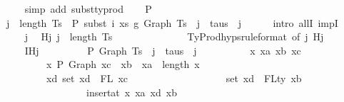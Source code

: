 \begin{isabellebody}
\ \ \ \ \ \ \isamarkupfalse%
\ {\isacharparenleft}{\kern0pt}simp\ add{\isacharcolon}{\kern0pt}\ subst{\isacharunderscore}{\kern0pt}typrod{\isacharparenright}{\kern0pt}\isanewline
\isanewline
\ \ \isamarkupfalse%
\ P{}{}{\isacharcolon}{\kern0pt}\isanewline
\ \ \ \ {\isachardoublequoteopen}{\isasymforall}j\ {\isacharless}{\kern0pt}\ length\ Ts{\isachardot}{\kern0pt}\ {\isasymGamma}{}\ {\isasymturnstile}{\isacharbraceleft}{\kern0pt}P{\isacharbraceright}{\kern0pt}\ subst\ i\ xs\ g{}\ {\isacharparenleft}{\kern0pt}Graph\ {\isacharparenleft}{\kern0pt}Ts\ {\isacharbang}{\kern0pt}\ j{\isacharparenright}{\kern0pt}{\isacharparenright}{\kern0pt}\ {\isacharcolon}{\kern0pt}\ taus\ {\isacharbang}{\kern0pt}\ j{\isachardoublequoteclose}\isanewline
\ \ \ \ \isamarkupfalse%
\ {\isacharparenleft}{\kern0pt}intro\ allI\ impI{\isacharparenright}{\kern0pt}\isanewline
\ \ \ \ \ \ \isamarkupfalse%
\ j\ \isamarkupfalse%
\ Hj{\isacharcolon}{\kern0pt}\ {\isachardoublequoteopen}j\ {\isacharless}{\kern0pt}\ length\ Ts{\isachardoublequoteclose}\isanewline
\isanewline
\ \ \ \ \ \ \isanewline
\ \ \ \ \ \ \isamarkupfalse%
\ TyProd{\isachardot}{\kern0pt}hyps{\isacharparenleft}{\kern0pt}{}{\isacharparenright}{\kern0pt}{\isacharbrackleft}{\kern0pt}rule{\isacharunderscore}{\kern0pt}format{\isacharcomma}{\kern0pt}\ of\ j{\isacharbrackright}{\kern0pt}\ Hj\isanewline
\ \ \ \ \ \ \isamarkupfalse%
\ IHj{\isacharcolon}{\kern0pt}\isanewline
\ \ \ \ \ \ \ \ {\isachardoublequoteopen}{\isasymGamma}\ {\isasymturnstile}{\isacharbraceleft}{\kern0pt}P{\isacharbraceright}{\kern0pt}\ Graph\ {\isacharparenleft}{\kern0pt}Ts\ {\isacharbang}{\kern0pt}\ j{\isacharparenright}{\kern0pt}\ {\isacharcolon}{\kern0pt}\ taus\ {\isacharbang}{\kern0pt}\ j\ {\isasymand}\isanewline
\ \ \ \ \ \ \ \ \ {\isacharparenleft}{\kern0pt}{\isasymforall}x\ xa\ xb\ xc{\isachardot}{\kern0pt}\isanewline
\ \ \ \ \ \ \ \ \ \ \ \ x\ {\isasymturnstile}{\isacharbraceleft}{\kern0pt}P{\isacharbraceright}{\kern0pt}\ Graph\ xc\ {\isacharcolon}{\kern0pt}\ xb\ {\isasymlongrightarrow}\ xa\ {\isasymle}\ length\ x\ {\isasymlongrightarrow}\isanewline
\ \ \ \ \ \ \ \ \ \ \ \ {\isacharparenleft}{\kern0pt}{\isasymforall}xd{\isachardot}{\kern0pt}\ set\ xd\ {\isacharequal}{\kern0pt}\ FL\ xc\ {\isasymlongrightarrow}\isanewline
\ \ \ \ \ \ \ \ \ \ \ \ \ \ \ \ \ \ set\ xd\ {\isacharequal}{\kern0pt}\ FLty\ xb\ {\isasymlongrightarrow}\isanewline
\ \ \ \ \ \ \ \ \ \ \ \ \ \ \ \ \ \ {\isasymGamma}\ {\isacharequal}{\kern0pt}\ insert{\isacharunderscore}{\kern0pt}at\ x\ xa\ {\isacharparenleft}{\kern0pt}xd{\isacharcomma}{\kern0pt}\ xb{\isacharparenright}{\kern0pt}\ {\isasymlongrightarrow}\isanewline

\end{isabellebody}
